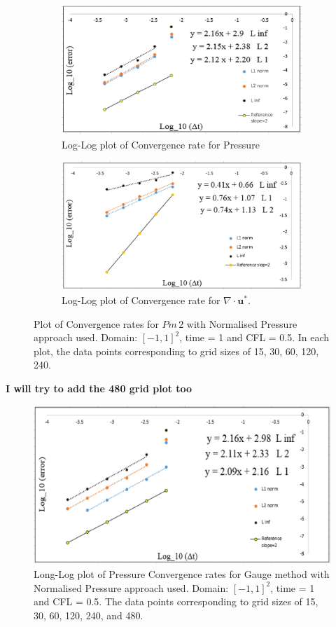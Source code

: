 \begin{figure}[H]
	\centering
	\begin{subfigure}[t]{4.5in}
		\centering
		\includegraphics[width=4.5in]{figures/Pm2_pf2_np_P_rate_c_0_5.jpg}
		\caption{Log-Log plot of Convergence rate for Pressure}\label{fig:6.19a}		
	\end{subfigure}
	\quad
	\begin{subfigure}[t]{4.5in}
		\centering
		\includegraphics[width=4.5in]{figures/Pm2_pf2_np_div_uvstar_rate_c_0_5.jpg}
		\caption{Log-Log plot of Convergence rate for $\nabla \cdot \textbf{u}^*$. }\label{fig:6.19b}
	\end{subfigure}
	\caption{Plot of Convergence rates for $Pm\,2$ with Normalised Pressure approach used. Domain: $[-1,1]^2$, time = 1 and CFL = 0.5. In each plot, the data points corresponding to grid sizes of 15, 30, 60, 120, 240.}\label{fig:6.16}
\end{figure}
\textbf{I will try to add the 480 grid plot too}

\begin{figure}[H]
	\centering
	\includegraphics[width=4.5in]{figures/Gauge_pf2_np_P_rate_c_0_5.jpg}
	\caption{Long-Log plot of Pressure Convergence rates for Gauge method with Normalised Pressure approach used. Domain: $[-1,1]^2$, time = 1 and CFL = 0.5. The data points corresponding to grid sizes of 15, 30, 60, 120, 240, and 480.}\label{fig:6.16}
\end{figure}

